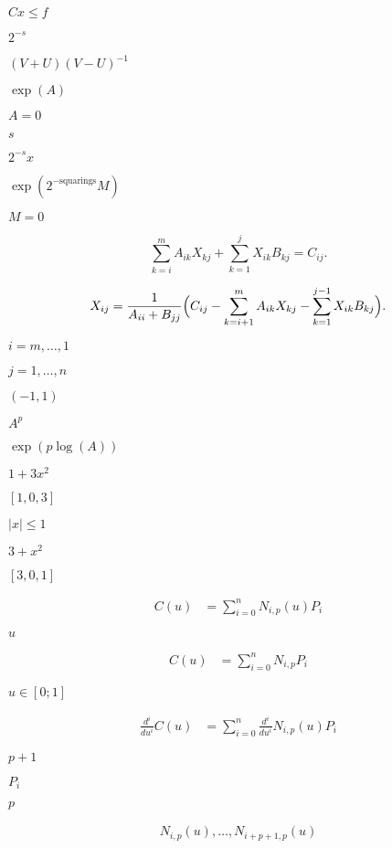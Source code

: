 \documentclass{article}
\begin{document}
$ Cx \le f $
\pagebreak

$ 2^{-s} $
\pagebreak

$ (V+U)(V-U)^{-1} $
\pagebreak

$ \exp(A) $
\pagebreak

$ A = 0 $
\pagebreak

$ s $
\pagebreak

$ 2^{-s} x $
\pagebreak

$ \exp(2^{-\mbox{squarings}}M) $
\pagebreak

$ M = 0 $
\pagebreak

\[ \sum_{k=i}^m A_{ik} X_{kj} + \sum_{k=1}^j X_{ik} B_{kj} = C_{ij}. \]
\pagebreak

\[ X_{ij} = \frac{1}{A_{ii} + B_{jj}} \Bigl( C_{ij} - \sum_{k=i+1}^m A_{ik} X_{kj} - \sum_{k=1}^{j-1} X_{ik} B_{kj} \Bigr). \]
\pagebreak

$ i=m,\ldots,1 $
\pagebreak

$ j=1,\ldots,n $
\pagebreak

$ (-1, 1) $
\pagebreak

$ A^p $
\pagebreak

$ \exp(p \log(A)) $
\pagebreak

$ 1 + 3x^2 $
\pagebreak

$ [ 1, 0, 3 ] $
\pagebreak

$ |x| \le 1 $
\pagebreak

$ 3 + x^2 $
\pagebreak

$ [ 3, 0, 1 ] $
\pagebreak

\begin{align*} C(u) & = \sum_{i=0}^{n}N_{i,p}(u)P_i \end{align*}
\pagebreak

$u$
\pagebreak

\begin{align*} C(u) & = \sum_{i=0}^{n}N_{i,p}P_i \end{align*}
\pagebreak

$u \in [0;1]$
\pagebreak

\begin{align*} \frac{d^i}{du^i}C(u) & = \sum_{i=0}^{n} \frac{d^i}{du^i} N_{i,p}(u)P_i \end{align*}
\pagebreak

$p+1$
\pagebreak

$P_i$
\pagebreak

$p$
\pagebreak

\begin{align*} N_{i,p}(u), \hdots, N_{i+p+1,p}(u) \end{align*}
\pagebreak
\end{document}

